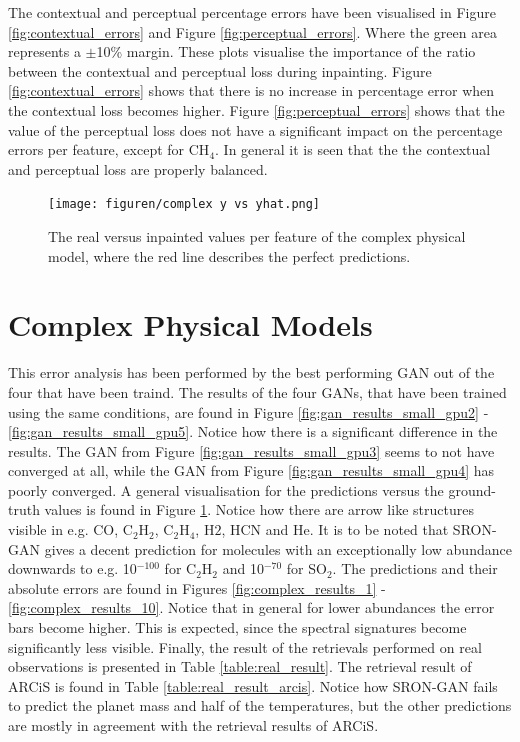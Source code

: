 The contextual and perceptual percentage errors have been visualised in Figure \ref{fig:contextual_errors} and Figure \ref{fig:perceptual_errors}. Where the green area represents a $\pm$10\% margin. These plots visualise the importance of the ratio between the contextual and perceptual loss during inpainting. Figure \ref{fig:contextual_errors} shows that there is no increase in percentage error when the contextual loss becomes higher. Figure \ref{fig:perceptual_errors} shows that the value of the perceptual loss does not have a significant impact on the percentage errors per feature, except for CH$_4$. In general it is seen that the the contextual and perceptual loss are properly balanced.



\begin{figure} [!htb]
    \centering
    \texttt{[image: figuren/complex y vs yhat.png]}
    \caption{The real versus inpainted values per feature of the complex physical model, where the red line describes the perfect predictions.}
    \label{fig:complex_results_main}
\end{figure}


\section{Complex Physical Models}
This error analysis has been performed by the best performing GAN out of the four that have been traind. The results of the four GANs, that have been trained using the same conditions, are found in Figure \ref{fig:gan_results_small_gpu2} - \ref{fig:gan_results_small_gpu5}. Notice how there is a significant difference in the results. The GAN from Figure \ref{fig:gan_results_small_gpu3} seems to not have converged at all, while the GAN from Figure \ref{fig:gan_results_small_gpu4} has poorly converged.
A general visualisation for the predictions versus the ground-truth values is found in Figure \ref{fig:complex_results_main}. Notice how there are arrow like structures visible in e.g. CO, C$_2$H$_2$, C$_2$H$_4$, H$2$, HCN and He. It is to be noted that SRON-GAN gives a decent prediction for molecules with an exceptionally low abundance downwards to e.g. 10$^{-100}$ for C$_2$H$_2$ and 10$^{-70}$ for SO$_2$.
The predictions and their absolute errors are found in Figures \ref{fig:complex_results_1} - \ref{fig:complex_results_10}. Notice that in general for lower abundances the error bars become higher. This is expected, since the spectral signatures become significantly less visible. 
Finally, the result of the retrievals performed on real observations is presented in Table \ref{table:real_result}. The retrieval result of ARCiS is found in Table \ref{table:real_result_arcis}. Notice how SRON-GAN fails to predict the planet mass and half of the temperatures, but the other predictions are mostly in agreement with the retrieval results of ARCiS.

